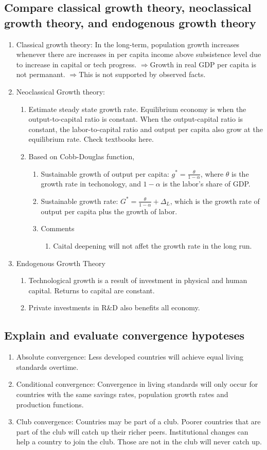 \documentclass{article}
\newcommand{\be}{\begin{enumerate}}
\newcommand{\ee}{\end{enumerate}}
\newcommand{\Ra}{$\Rightarrow$}
\begin{document}
\subsection{Compare classical growth theory, neoclassical growth theory, and endogenous
growth theory}
\be
    \item Classical growth theory: In the long-term, population growth increases whenever
        there are increases in per capita income above subsistence level due to increase
        in capital or tech progress. \Ra Growth in real GDP per capita
        is not permanant. \Ra This is not supported by observed facts.
    \item Neoclassical Growth theory:
        \be
            \item Estimate steady state growth rate. Equilibrium economy is when the output-to-capital
                ratio is constant. When the output-capital ratio is constant, the labor-to-capital
                ratio and output per capita also grow at the equilibrium rate. Check textbooks here.
            \item Based on Cobb-Douglas function, 
                \be
                    \item Sustainable growth of output per capita: $g^\ast=\frac{\theta}{1-\alpha}$,
                        where $\theta$ is the growth rate in techonology, and $1-\alpha$ 
                        is the labor's share of GDP.
                    \item Sustainable growth rate: $G^\ast=\frac{\theta}{1-\alpha}
                        +\Delta_L$, which is the growth rate of output per  capita plus
                        the growth of labor.
                    \item Comments
                        \be
                            \item Caital deepening will not affet the growth rate in the long run.
                        \ee
                \ee
        \ee
    \item Endogenous Growth Theory
        \be
            \item Technological growth is a result of investment in physical and human capital. Returns to capital are constant.
            \item Private investments in R\&D also benefits all economy.
        \ee
\ee
\subsection{Explain and evaluate convergence hypoteses}
\be
    \item Absolute convergence: Less developed countries will achieve equal living standards
        overtime.
    \item Conditional convergence: Convergence in living standards will only occur for countries with the same savings rates, population
        growth rates and production functions. 
    \item Club convergence: Countries may be part of a club. Poorer countries that are part of the club will catch up
        their richer peers. Institutional changes can help a country to join the club. 
        Those are not in the club will never catch up.
\ee
\end{document}
